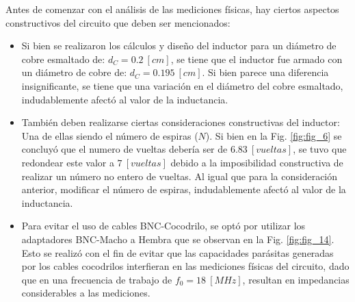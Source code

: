 \documentclass[conference]{IEEEtran}
\begin{document}
Antes de comenzar con el análisis de las mediciones físicas, hay ciertos aspectos constructivos del circuito que deben ser mencionados:
\begin{itemize}
    \item Si bien se realizaron los cálculos y diseño del inductor para un diámetro de cobre esmaltado de: $d_{C} = 0.2 \ [cm]$, se tiene que el inductor fue armado con un diámetro de cobre de: $d_{C} = 0.195 \ [cm]$. Si bien parece una diferencia insignificante, se tiene que una variación en el diámetro del cobre esmaltado, indudablemente afectó al valor de la inductancia.
    
    \item También deben realizarse ciertas consideraciones constructivas del inductor: Una de ellas siendo el número de espiras ($N$). Si bien en la Fig. \ref{fig:fig_6} se concluyó que el numero de vueltas debería ser de $6.83 \ [vueltas]$, se tuvo que redondear este valor a $7 \ [vueltas]$ debido a la imposibilidad constructiva de realizar un número no entero de vueltas. Al igual que para la consideración anterior, modificar el número de espiras, indudablemente afectó al valor de la inductancia.
    
    \item Para evitar el uso de cables BNC-Cocodrilo, se optó por utilizar los adaptadores BNC-Macho a Hembra que se observan en la Fig. \ref{fig:fig_14}. Esto se realizó con el fin de evitar que las capacidades parásitas generadas por los cables cocodrilos interfieran en las mediciones físicas del circuito, dado que en una frecuencia de trabajo de $f_{0} = 18 \ [MHz]$, resultan en impedancias considerables a las mediciones.
\end{itemize}
\end{document}
